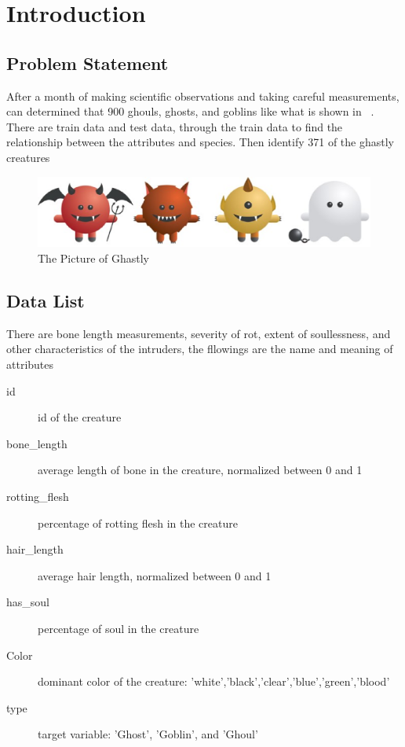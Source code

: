 
\section{Introduction}\label{sec-intro}

\subsection{Problem Statement}


After a month of making scientific observations 
and taking careful measurements, 
can determined that 900 ghouls, ghosts, and goblins
like what is shown in~  .
There are train data and test data,
through the train data to find the relationship
between the attributes and species.
Then identify 371 of the ghastly creatures


\begin{figure}[htbp]
	\centering
	\includegraphics[scale=0.3]{figures/bar.eps}
	\caption{The Picture of Ghastly}\label{fig:animal}
\end{figure}


\subsection{Data List}


There are bone length measurements, 
severity of rot, extent of soullessness, 
and other characteristics of the intruders,
the fllowings are the  
name and meaning of attributes


\begin{description}
	\item[id] id of the creature
	\item[bone_length] average length of bone in the creature, normalized between 0 and 1
	\item[rotting_flesh] percentage of rotting flesh in the creature
	\item[hair_length] average hair length, normalized between 0 and 1
	\item[has_soul] percentage of soul in the creature
	\item[Color] dominant color of the creature: 'white','black','clear','blue','green','blood'
	\item[type] target variable: 'Ghost', 'Goblin', and 'Ghoul'
\end{description}


